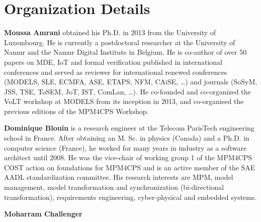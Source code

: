 \section{Organization Details}
\noindent
\textbf{Moussa Amrani} obtained his Ph.D. in 2013 from the University of Luxembourg. He is currently a postdoctoral researcher at the University of Namur and the Namur Digital Institute in Belgium. 
He is co-author of over 50 papers on MDE, IoT and formal verification published in international conferences and served as reviewer for international renewed conferences (MODELS, SLE, ECMFA, ASE, ETAPS, NFM, CAiSE, \ldots) and journals (SoSyM, JSS, TSE, ToSEM, JoT, IST, ComLan, \ldots). He co-founded and co-organized the VoLT workshop at MODELS from its inception in 2013, and co-organised
the previous editions of the MPM4CPS Workshop.

\noindent
\textbf{Dominique Blouin} is a research engineer at the Telecom ParisTech engineering school in France. 
After obtaining an M. Sc. in physics (Canada) and a Ph.D. in computer science (France), he worked for many years in industry as a software architect until 2008. He was the vice-chair of working group 1 of the MPM4CPS COST action on foundations for MPM4CPS and is an active member of the SAE AADL standardization committee. 
His research interests are MPM, model management, model transformation and synchronization (bi-directional transformation), requirements engineering, cyber-physical and embedded systems.

\noindent
\textbf{Moharram Challenger} 

